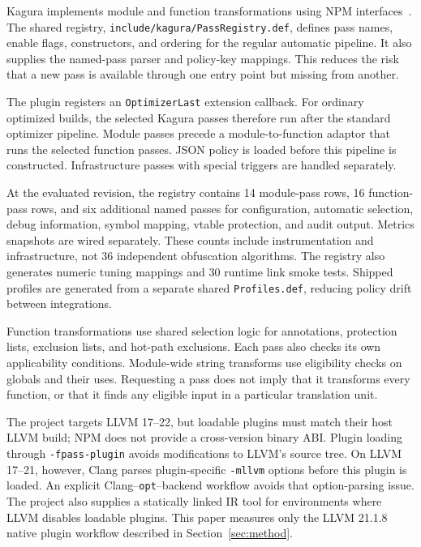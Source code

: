 \documentclass[conference]{IEEEtran}
\begin{document}
Kagura implements module and function transformations using NPM
interfaces~\cite{llvmNPM}. The shared registry,
\texttt{include/kagura/PassRegistry.def}, defines pass names, enable
flags, constructors, and ordering for the regular automatic pipeline.
It also supplies the named-pass parser and policy-key mappings.
This reduces the risk that a new pass is available through one entry
point but missing from another.

The plugin registers an \texttt{OptimizerLast} extension callback.
For ordinary optimized builds, the selected Kagura passes therefore
run after the standard optimizer pipeline. Module passes precede a
module-to-function adaptor that runs the selected function passes.
JSON policy is loaded before this pipeline is constructed. Infrastructure
passes with special triggers are handled separately.

At the evaluated revision, the registry contains 14 module-pass rows,
16 function-pass rows, and six additional named passes for configuration,
automatic selection, debug information, symbol mapping, vtable protection,
and audit output. Metrics snapshots are wired separately. These counts
include instrumentation and infrastructure, not 36 independent obfuscation
algorithms. The registry also generates numeric tuning mappings and
30 runtime link smoke tests. Shipped profiles are generated from a separate
shared \texttt{Profiles.def}, reducing policy drift between integrations.


Function transformations use shared selection logic for annotations,
protection lists, exclusion lists, and hot-path exclusions. Each pass
also checks its own applicability conditions. Module-wide string
transforms use eligibility checks on globals and their uses. Requesting
a pass does not imply that it transforms every function, or that it
finds any eligible input in a particular translation unit.

The project targets LLVM 17--22, but loadable plugins must match their
host LLVM build; NPM does not provide a cross-version binary ABI.
Plugin loading through \texttt{-fpass-plugin} avoids modifications to
LLVM's source tree. On LLVM 17--21, however, Clang parses plugin-specific
\texttt{-mllvm} options before this plugin is loaded. An explicit
Clang--\texttt{opt}--backend workflow avoids that option-parsing issue.
The project also supplies a statically linked IR tool for environments
where LLVM disables loadable plugins. This paper measures only the
LLVM 21.1.8 native plugin workflow described in Section~\ref{sec:method}.
\end{document}
